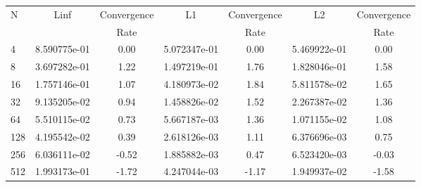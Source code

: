 \documentclass[12pt]{article}
\begin{document}
	\begin{tabular}{l|c|c|c|c|c|c}
		N&Linf&Convergence&L1&Convergence&L2&Convergence\\
		&&Rate&&Rate&&Rate\\
		\hline
		4&8.590775e-01&0.00&5.072347e-01&0.00&5.469922e-01&0.00\\
		\hline
		8&3.697282e-01&1.22&1.497219e-01&1.76&1.828046e-01&1.58\\
		\hline
		16&1.757146e-01&1.07&4.180973e-02&1.84&5.811578e-02&1.65\\
		\hline
		32&9.135205e-02&0.94&1.458826e-02&1.52&2.267387e-02&1.36\\
		\hline
		64&5.510115e-02&0.73&5.667187e-03&1.36&1.071155e-02&1.08\\
		\hline
		128&4.195542e-02&0.39&2.618126e-03&1.11&6.376696e-03&0.75\\
		\hline
		256&6.036111e-02&-0.52&1.885882e-03&0.47&6.523420e-03&-0.03\\
		\hline
		512&1.993173e-01&-1.72&4.247044e-03&-1.17&1.949937e-02&-1.58\\
	\end{tabular}
\end{document}
